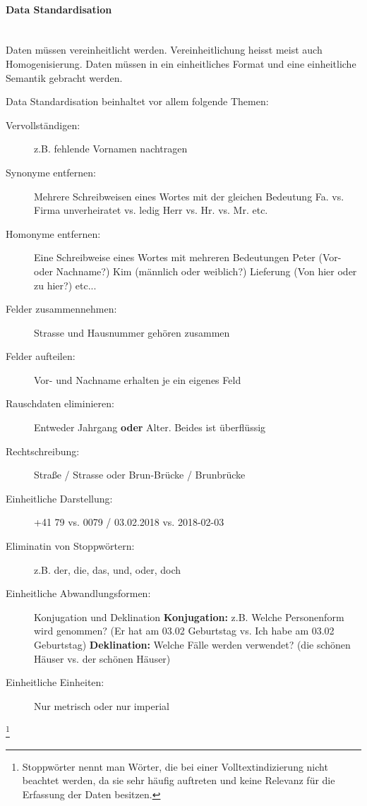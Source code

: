 \documentclass[a4paper, 11pt, nofootinbib]{article}
\begin{document}
\paragraph{Data Standardisation}\mbox{}\\
Daten müssen vereinheitlicht werden. Vereinheitlichung heisst meist auch Homogenisierung. Daten müssen in ein einheitliches Format und eine einheitliche Semantik gebracht werden.

Data Standardisation beinhaltet vor allem folgende Themen:

\begin{description}
	\item[Vervollständigen: ] z.B. fehlende Vornamen nachtragen
	\item[Synonyme entfernen: ] Mehrere Schreibweisen eines Wortes mit der gleichen Bedeutung 
		\subitem Fa. vs. Firma
		\subitem unverheiratet vs. ledig
		\subitem Herr vs. Hr. vs. Mr.
		\subitem etc.
	\item[Homonyme entfernen: ] Eine Schreibweise eines Wortes mit mehreren Bedeutungen
		\subitem Peter (Vor- oder Nachname?)
		\subitem Kim (männlich oder weiblich?)
		\subitem Lieferung (Von hier oder zu hier?)
		\subitem etc...
	\item[Felder zusammennehmen: ] Strasse und Hausnummer gehören zusammen
	\item[Felder aufteilen: ] Vor- und Nachname erhalten je ein eigenes Feld
	\item[Rauschdaten eliminieren: ] Entweder Jahrgang \textbf{oder} Alter. Beides ist überflüssig
	\item[Rechtschreibung: ]  Straße / Strasse oder Brun-Brücke / Brunbrücke 
	\item[Einheitliche Darstellung: ] +41 79 vs. 0079 / 03.02.2018 vs. 2018-02-03
	\item[Eliminatin von Stoppwörtern: ] z.B. der, die, das, und, oder, doch
	\item[Einheitliche Abwandlungsformen: ]  Konjugation und Deklination
		\subitem \textbf{Konjugation: }z.B. Welche Personenform wird genommen? (Er hat am 03.02 Geburtstag vs. Ich habe am 03.02 Geburtstag)
		\subitem \textbf{Deklination: }Welche Fälle werden verwendet? (die schönen Häuser vs. der schönen Häuser)
	\item[Einheitliche Einheiten: ] Nur metrisch oder nur imperial
\end{description}\footnote{Stoppwörter nennt man Wörter, die bei einer Volltextindizierung nicht beachtet werden, da sie sehr häufig auftreten und keine Relevanz für die Erfassung der Daten besitzen.}
\end{document}

